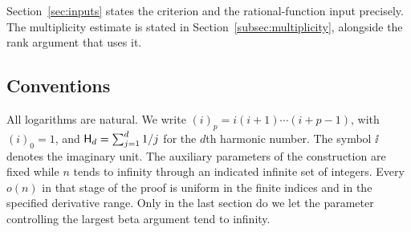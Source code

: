 Section~\ref{sec:inputs} states the criterion and the rational-function
input precisely. The multiplicity estimate is stated in
Section~\ref{subsec:multiplicity}, alongside the rank argument that uses it.

\subsection{Conventions}

All logarithms are natural. We write
$(i)_p=i(i+1)\cdots(i+p-1)$, with $(i)_0=1$, and
$\mathsf H_d=\sum_{j=1}^d1/j$ for the $d$th harmonic number.
The symbol $\ii$ denotes the imaginary unit.
The auxiliary parameters of the construction are fixed while $n$ tends
to infinity through an indicated infinite set of integers.
Every $o(n)$ in that stage of the proof is uniform in the finite indices
and in the specified derivative range. Only in the last section do we
let the parameter controlling the largest beta argument tend to infinity.

